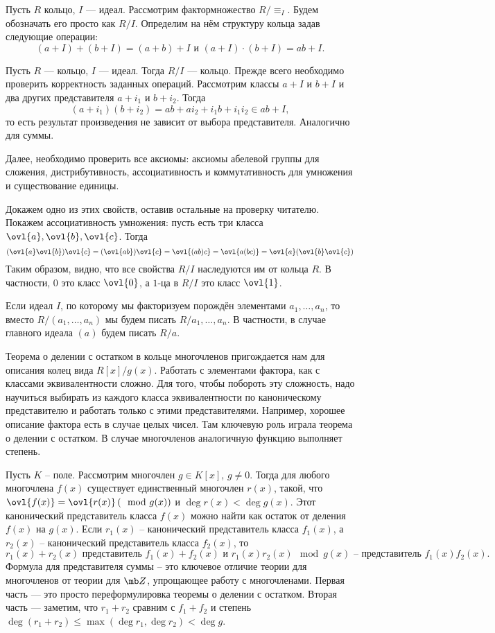 \dfn Пусть $R$ кольцо, $I$ --- идеал. Рассмотрим фактормножество $R/\equiv_I$. Будем обозначать его просто как $R/I$. Определим на нём структуру кольца задав следующие операции:\\
$$(a+I)+ (b+I) = (a+b)+I \text{ и } (a+I)\cdot (b+I)=ab+I. $$
\edfn

 Пусть $R$ --- кольцо, $I$ --- идеал. Тогда $R/I$ --- кольцо.
\elm
\proof
Прежде всего необходимо проверить корректность заданных операций. Рассмотрим классы $a+I$ и $b+I$ и два других представителя $a+i_1$ и $b+i_2$. Тогда $$(a+i_1)(b+i_2)=ab +ai_2+i_1b+ i_1i_2 \in ab+I,$$
то есть результат произведения не зависит от выбора представителя. Аналогично для суммы.

Далее, необходимо проверить все аксиомы: аксиомы абелевой группы для сложения, дистрибутивность, ассоциативность  и коммутативность для умножения и существование единицы.

Докажем одно из этих свойств, оставив остальные на проверку читателю. Покажем ассоциативность умножения: пусть есть три класса $\ovl{a},\ovl{b},\ovl{c}$. Тогда
$$(\ovl{a}\ovl{b})\ovl{c}=(\ovl{ab})\ovl{c}=\ovl{(ab)c}=\ovl{a(bc)}=\ovl{a}(\ovl{b}\ovl{c})$$
Таким образом, видно, что все свойства $R/I$ наследуются им от кольца $R$. В частности, $0$ это класс $\ovl{0}$, а $1$-ца в $R/I$ это класс $\ovl{1}$.
\endproof

Если идеал $I$, по которому мы факторизуем порождён элементами $a_1,\dots,a_n$, то вместо $R/(a_1,\dots,a_n)$ мы будем писать $R/a_1,\dots,a_n$. В частности, в случае главного идеала $(a)$ будем писать $R/a$.

Теорема о делении с остатком в кольце многочленов  пригождается нам для описания колец вида $R[x]/g(x)$. Работать с элементами фактора, как с классами эквивалентности сложно. Для того, чтобы побороть эту сложность, надо научиться выбирать из каждого класса эквивалентности по каноническому представителю и работать только с этими представителями. Например, хорошее описание фактора есть в случае  целых чисел. Там ключевую роль играла теорема о делении с остатком. В случае многочленов аналогичную функцию выполняет степень.


 Пусть $K$ -- поле. Рассмотрим многочлен $g \in K[x]$, $g\neq 0$. Тогда для любого многочлена $f(x)$ существует единственный многочлен $r(x)$, такой, что $\ovl{f(x)}=\ovl{r(x)} \,(\mod g(x))$ и $\deg r(x) < \deg g(x)$.
Этот канонический представитель класса $f(x)$ можно найти как остаток от деления $f(x)$ на  $g(x)$. Если $r_1(x)$ -- канонический представитель класса $f_1(x)$, а $r_2(x)$ -- канонический представитель класса $f_2(x)$, то 
$$r_1(x)+r_2(x) \text{ представитель  $f_1(x)+f_2(x)$ и } r_1(x)r_2(x) \mod g(x) \text{ -- представитель } f_1(x)f_2(x).$$
Формула для представителя суммы -- это ключевое отличие теории для многочленов от теории для $\mb Z$, упрощающее работу с многочленами.
\ethrm
\proof
Первая часть --- это просто переформулировка теоремы о делении с остатком. Вторая часть --- заметим, что $r_1+r_2$ сравним с $f_1+f_2$ и степень $\deg(r_1+r_2)\leq \max(\deg r_1, \deg r_2) < \deg g$.
\endproof

